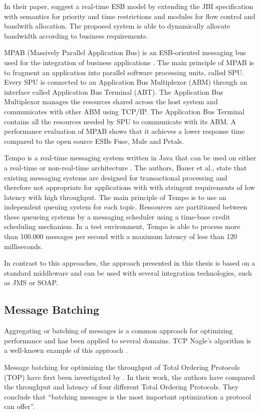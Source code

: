 In their paper, \cite{Xia:2011rt} suggest a real-time \ac{ESB} model by extending the JBI specification with semantics for priority and time restrictions and modules for flow control and bandwith allocation. The proposed system is able to dynamically allocate bandwidth according to business requirements.

MPAB (Massively Parallel Application Bus) is an \ac{ESB}-oriented messaging bus used for the integration of business applications \citep{Benosman:2012zr}. The main principle of MPAB is to fragment an application into parallel software processing units, called SPU. Every SPU is connected to an Application Bus Multiplexor (ABM) through an interface called Application Bus Terminal (ABT). The Application Bus Multiplexor manages the resources shared across the host system and communicates with other ABM using TCP/IP. The Application Bus Terminal contains all the resources needed by SPU to communicate with its ABM. A performance evaluation of MPAB shows that it achieves a lower response time compared to the open source ESBs Fuse, Mule and Petals.

Tempo is a real-time messaging system written in Java that can be used on either a real-time or non-real-time architecture \citep{Bauer:2008fk}. The authors, Bauer et al., state that existing messaging systems are designed for transactional processing and therefore not appropriate for applications with with stringent requirements of low latency with high throughput. The main principle of Tempo is to use an independent queuing system for each topic. Ressources are partitioned between these queueing systems by a messaging scheduler using a time-base credit scheduling mechanism. In a test environment, Tempo is able to process more than 100.000 messages per second with a maximum latency of less than 120 milliseconds.

In contrast to this approaches, the approach presented in this thesis is based on a standard middleware and can be used with several integration technologies, such as \ac{JMS} or SOAP.

\subsection{Message Batching}
Aggregating or batching of messages is a common approach for optimizing performance and has been applied to several domains. TCP Nagle's algorithm is a well-known example of this approach \citep{Nagle:1984:CCI:1024908.1024910}.

Message batching for optimizing the throughput of Total Ordering Protocols (TOP) have first been investigated by \cite{Friedman:1997aa}. In their work, the authors have compared the throughput and latency of four different Total Ordering Protocols. They conclude that ``batching messages is the most important optimization a protocol can offer''.

